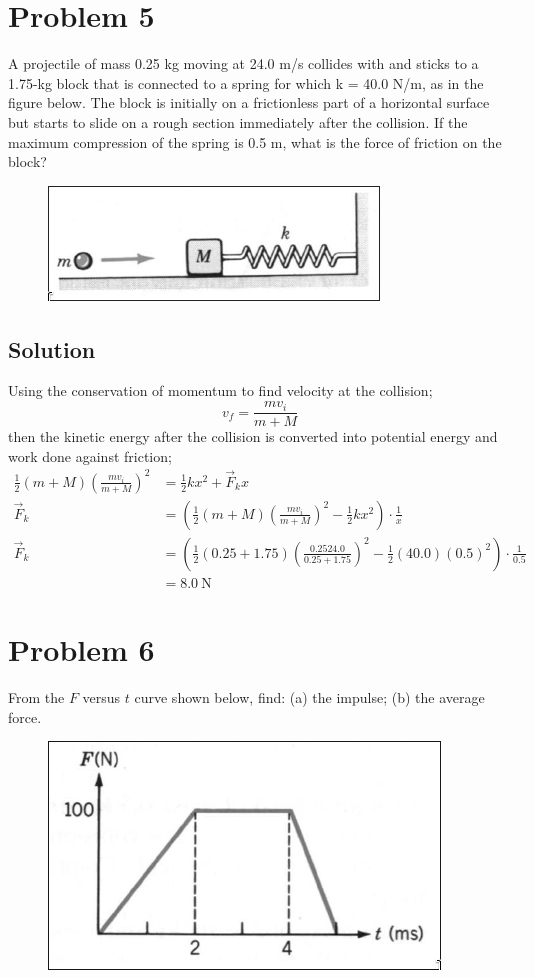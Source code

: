 \documentclass{article}
\begin{document}
\section*{Problem 5}
A projectile of mass 0.25 kg moving at 24.0 m/s collides with and sticks to a 1.75-kg block
that is connected to a spring for which k = 40.0 N/m, as in the figure below. The block is
initially on a frictionless part of a horizontal surface but starts to slide on a rough section
immediately after the collision. If the maximum compression of the spring is 0.5 m, what is the
force of friction on the block?

\begin{figure}[ht]
    \centering
    \includegraphics[scale=0.5]{drawing-2.png}
\end{figure}

\subsection*{Solution}
Using the conservation of momentum to find velocity at the collision;
\[
	v_f = \frac{m v_i}{m+M}
\]
then the kinetic energy after the collision is converted into potential energy and work done against friction;
\begin{align*}
	\frac{1}{2}(m+M)\left(\frac{m v_i}{m+M}\right)^2 &= \frac{1}{2}kx^2 + \vec{F}_k x \\
	\vec{F}_k &= \left(\frac{1}{2}(m+M)\left(\frac{m v_i}{m+M}\right)^2 - \frac{1}{2}kx^2\right) \cdot \frac{1}{x}\\
	\vec{F}_k &= \left(\frac{1}{2}(0.25+1.75)\left(\frac{0.25 24.0}{0.25+1.75}\right)^2 - \frac{1}{2}(40.0)(0.5)^2 \right) \cdot \frac{1}{0.5} \\
		  &= \boxed{8.0 \ \text{N}}
\end{align*}

\section*{Problem 6}
From the $F$ versus $t$ curve shown below, find: (a) the impulse; (b) the average force.


\begin{figure}[ht]
    \centering
    \includegraphics[scale=0.5]{drawing-3.png}
\end{figure}
\end{document}
